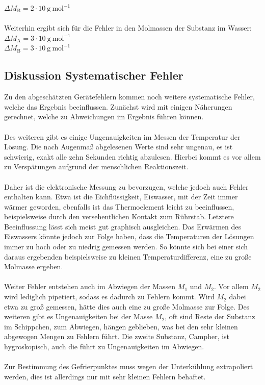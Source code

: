 \documentclass[12pt,a4paper,titlepage,headinclude,bibtotoc]{scrartcl}
\begin{document}
$\Delta M_\mathrm{B} = 2 \cdot 10 {~}\mathrm{g{~}mol^{-1}}$\\\\

Weiterhin ergibt sich für die Fehler in den Molmassen der Substanz im Wasser:\\
$\Delta M_\mathrm{A} = 3 \cdot 10  {~}\mathrm{g{~}mol^{-1}} $\\
$\Delta M_\mathrm{B} = 3 \cdot 10 {~}\mathrm{g{~}mol^{-1}}$\\

\subsection{Diskussion Systematischer Fehler}
Zu den abgeschätzten Gerätefehlern kommen noch weitere systematische Fehler, welche das Ergebnis beeinflussen. Zunächst wird mit einigen Näherungen gerechnet, welche zu Abweichungen im Ergebnis führen können.\\\\
Des weiteren gibt es einige Ungenauigkeiten im Messen der Temperatur der Lösung. Die nach Augenmaß abgelesenen Werte sind sehr ungenau, es ist schwierig, exakt alle zehn Sekunden richtig abzulesen. Hierbei kommt es vor allem zu Verspätungen aufgrund der menschlichen Reaktionszeit.\\\\ Daher ist die elektronische Messung zu bevorzugen, welche jedoch auch Fehler enthalten kann. Etwa ist die Eichflüssigkeit, Eiswasser, mit der Zeit immer wärmer geworden, ebenfalls ist das Thermoelement leicht zu beeinflussen, beispielsweise durch den versehentlichen Kontakt zum Rührstab. Letztere Beeinflussung lässt sich meist gut graphisch ausgleichen. Das Erwärmen des Eiswassers könnte jedoch zur Folge haben, dass die Temperaturen der Lösungen immer zu hoch oder zu niedrig gemessen werden. So könnte sich bei einer sich daraus ergebenden beispielsweise zu kleinen Temperaturdifferenz, eine zu große Molmasse ergeben.\\\\
Weiter Fehler entstehen auch im Abwiegen der Massen $M_1$ und $M_2$. Vor allem $M_2$ wird lediglich pipetiert, sodass es dadurch zu Fehlern kommt. Wird $M_2$ dabei etwa zu groß gemessen, hätte dies auch eine zu große Molmasse zur Folge. Des weiteren gibt es Ungenauigkeiten bei der Masse $M_2$, oft sind Reste der Substanz im Schippchen, zum Abwiegen, hängen geblieben, was bei den sehr kleinen abgewogen Mengen zu Fehlern führt. Die zweite Substanz, Campher, ist hygroskopisch, auch die führt zu Ungenauigkeiten im Abwiegen.\\\\
Zur Bestimmung des Gefrierpunktes muss wegen der Unterkühlung extrapoliert werden, dies ist allerdings nur mit sehr kleinen Fehlern behaftet.
\end{document}
